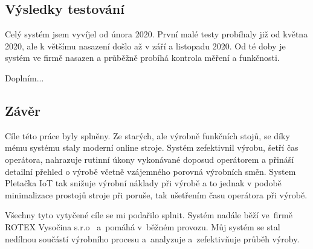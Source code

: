 \documentclass[12pt, a4paper]{article}
\begin{document}
\subsection*{Výsledky testování}
Celý systém jsem vyvíjel od února 2020. První malé testy probíhaly již od května 2020, ale k většímu nasazení došlo až v září a listopadu 2020.
Od té doby je systém ve firmě nasazen a průběžně probíhá kontrola měření a funkčnosti.

Doplním...






\subsection*{Závěr}



Cíle této práce byly splněny. Ze starých, ale výrobně funkčních stojů, se díky mému systému staly moderní online stroje.
Systém zefektivnil výrobu, šetří čas operátora, nahrazuje rutinní úkony vykonávané doposud operátorem a přináší detailní přehled o výrobě včetně vzájemného porovná výrobních směn.
System Pletačka IoT tak snižuje výrobní náklady při výrobě a to jednak v podobě minimalizace prostojů stroje při poruše, tak ušetřením času operátora při výrobě.

Všechny tyto vytyčené cíle se mi podařilo splnit. 
Systém nadále běží ve~firmě ROTEX Vysočina s.r.o~\cite{ROTEX} a~pomáhá v~běžném provozu.
Můj systém se stal nedílnou součástí výrobního procesu a analyzuje a~zefektivňuje průběh výroby.
\end{document}

